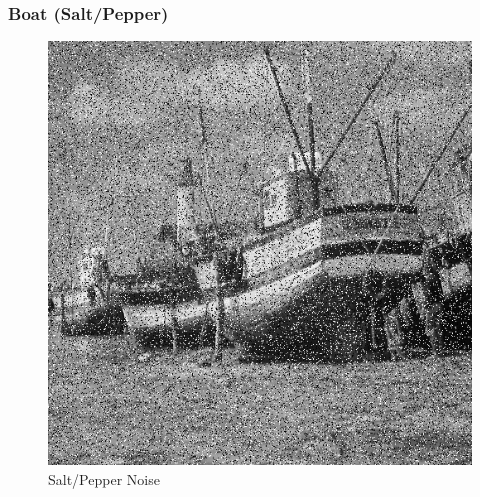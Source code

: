 \documentclass{article}
\begin{document}
    \subsubsection*{Boat (Salt/Pepper)}
    
    \begin{figure}[!htb]
    \begin{center}
     \includegraphics[scale=.3]{./basic_denoising/boat/sp.png}
     \caption{Salt/Pepper Noise}
    \end{center}
    \end{figure}
    
\end{document}
